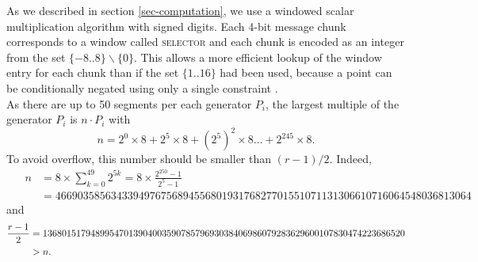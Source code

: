 As we described in section \ref{sec-computation}, 
we use a windowed scalar multiplication algorithm with signed digits. Each 4-bit message chunk corresponds to a window called \textsc{selector} and each chunk is encoded as an integer from the set $\{-8..8\}\backslash \{0\}$. %
This allows a more efficient lookup of the window entry for each chunk than if the set $\{1..16\}$ had been used, because a point can be conditionally negated using only a single constraint \cite{sapling}.\\

As there are up to 50 segments per each generator $P_i$, the largest multiple of the generator $P_i$ is $n\cdot P_i$ with 
$$n = 2^0 \times8 + 2^5 \times 8 + \left(2^5\right)^2 \times8 \dots + 	2^{245}\times 8 .$$
To avoid overflow, this number should be smaller than $(r-1)/2$. Indeed,
\begin{align*}
	\quad\; n 
	& = 8 \times \sum_{ k = 0}^{49} 2^{5k}
	= 8 \times \frac{2^{250}-1}{2^5-1}\\
	& = 466903585634339497675689455680193176827701551071131306610716064548036813064%
\end{align*}
\vspace{-0.2cm}
and 
\begin{align*}
	\frac{r-1}{2} &= 1368015179489954701390400359078579693038406986079283629600107830474223686520 \\
	& > n.\\ \vspace{0.4cm}
\end{align*}